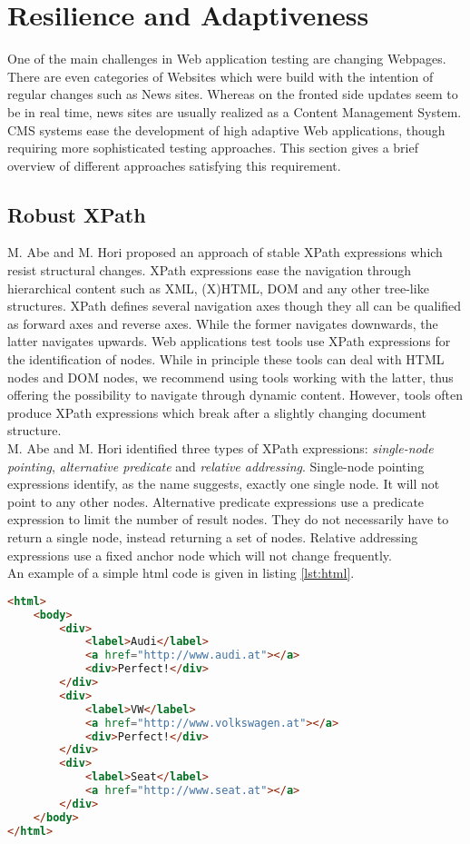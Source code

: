 \documentclass[12pt, notitlepage]{article}
\begin{document}
\section{Resilience and Adaptiveness}
One of the main challenges in Web application testing are changing Webpages. There are even categories of Websites which were build with the intention of regular
changes such as News sites. Whereas on the fronted side updates seem to be in real time, news sites are usually realized as a Content Management System. 
CMS systems ease the development of high adaptive Web applications, though requiring more sophisticated testing approaches. This section gives a brief overview 
of different approaches satisfying this requirement. 
\subsection{Robust XPath}
M. Abe and M. Hori proposed an approach\cite{robust-xpath} of stable XPath\cite{xpath} expressions which resist structural changes.
XPath expressions ease the navigation through hierarchical content such as XML\cite{xml}, (X)HTML\cite{html}, DOM\cite{dom} and any other tree-like structures.
XPath defines several navigation axes though they all can be qualified as forward axes and reverse axes. While the former navigates downwards,
the latter navigates upwards. Web applications test tools use XPath expressions for the identification of nodes. While in principle these tools can deal with HTML
nodes and DOM nodes, we recommend using tools working with the latter, thus offering the possibility to navigate through dynamic content. 
However, tools often produce XPath expressions which break after a slightly changing document structure. \\
M. Abe and M. Hori identified three types of XPath expressions: \textit{single-node pointing}, \textit{alternative predicate} and \textit{relative addressing}. 
Single-node pointing expressions identify, as the name suggests, exactly one single node. It will not point to any other nodes. Alternative predicate expressions
use a predicate expression to limit the number of result nodes. They do not necessarily have to return a single node, instead returning a set of nodes.
Relative addressing expressions use a fixed anchor node which will not change frequently.\\
An example of a simple html code is given in listing  \ref{lst:html}.
\begin{lstlisting}[language=HTML, caption={HTML code listing used as source for XPath expressions},label=lst:html]
<html>
	<body>
		<div>
			<label>Audi</label>
			<a href="http://www.audi.at"></a>
			<div>Perfect!</div>
		</div>
		<div>
			<label>VW</label>
			<a href="http://www.volkswagen.at"></a>
			<div>Perfect!</div>
		</div>
		<div>
			<label>Seat</label>
			<a href="http://www.seat.at"></a>
		</div>
	</body>
</html>
\end{lstlisting}
\end{document}
